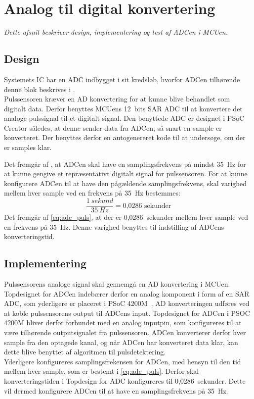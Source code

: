 \section{Analog til digital konvertering} \label{adc_design_impl}
\textit{Dette afsnit beskriver design, implementering og test af ADCen i MCUen.}

\subsection{Design}
Systemets IC har en ADC indbygget i sit kredsløb, hvorfor ADCen tilhørende denne blok beskrives i .\\
Pulssensoren kræver en AD konvertering for at kunne blive behandlet som digitalt data. Derfor benyttes MCUens 12~bits SAR ADC til at konvertere det analoge pulssignal til et digitalt signal. Den benyttede ADC er designet i PSoC Creator således, at denne sender data fra ADCen, så snart en sample er konverteret. Der benyttes derfor en autogenereret kode til at undersøge, om der er samples klar. 

Det fremgår af , at ADCen skal have en samplingsfrekvens på mindst 35~Hz for at kunne gengive et repræsentativt digitalt signal for pulssensoren. For at kunne konfigurere ADCen til at have den pågældende samplingsfrekvens, skal varighed mellem hver sample ved en frekvens på 35~Hz bestemmes:
\begin{equation}
\frac{1~sekund}{35~Hz} = \text{0,0286~sekunder}
\label{eq:adc_puls}
\end{equation}
Det fremgår af \eqref{eq:adc_puls}, at der er 0,0286~sekunder mellem hver sample ved en frekvens på 35~Hz. Denne varighed benyttes til indstilling af ADCens konverteringstid.

\subsection{Implementering}
Pulssensorens analoge signal skal gennemgå en AD konvertering i MCUen. Topdesignet for ADCen indebærer derfor en analog komponent i form af en SAR ADC, som yderligere er placeret i PSoC 4200M~\citep{Murphy2016}. AD konverteringen udføres ved at koble pulssensorens output til ADCens input. Topdesignet for ADCen i PSOC 4200M bliver derfor forbundet med en analog inputpin, som konfigureres til at være tilhørende outputsignalet fra pulssensoren. ADCen konverterer derfor hver sample fra den optagede kanal, og når ADCen har konverteret data klar, kan dette blive benyttet af algoritmen til pulsdetektering. \\
Yderligere konfigureres samplingsfrekensen for ADCen, med hensyn til den tid mellem hver sample, som er bestemt i \eqref{eq:adc_puls}. Derfor skal konverteringstiden i Topdesign for ADC konfigureres til 0,0286~sekunder. Dette vil dermed konfigurere ADCen til at have en samplingsfrekvens på 35~Hz.

